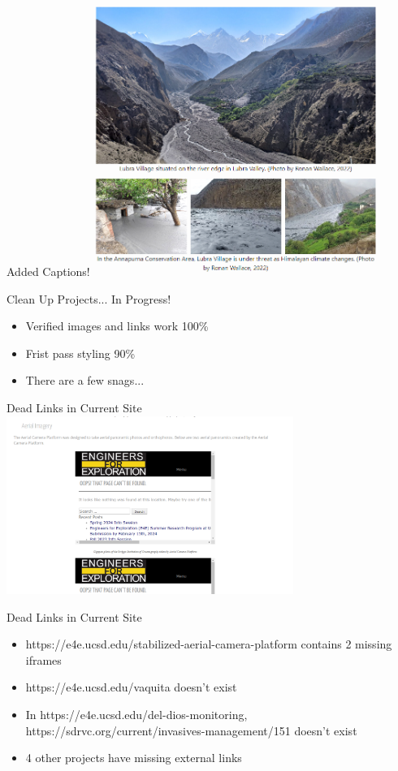 \begin{frame}{Added Captions!}
    \centering
    \includegraphics[height=0.7\textheight,width=0.7\textwidth,keepaspectratio]{images/Screenshot 2024-04-11 205424.png}
\end{frame}

\begin{frame}{Clean Up Projects... In Progress!}
    \begin{itemize}
        \item Verified images and links work 100\%
        \item Frist pass styling 90\%
        \item There are a few snags...
    \end{itemize}
\end{frame}

\begin{frame}{Dead Links in Current Site}
    \centering
    \includegraphics[height=0.7\textheight,width=0.7\textwidth,keepaspectratio]{images/dead_links.png}
\end{frame}

\begin{frame}{Dead Links in Current Site}
    \begin{itemize}
        \item https://e4e.ucsd.edu/stabilized-aerial-camera-platform contains 2 missing iframes
        \item https://e4e.ucsd.edu/vaquita doesn't exist
        \item In https://e4e.ucsd.edu/del-dios-monitoring, https://sdrvc.org/current/invasives-management/151 doesn't exist
        \item 4 other projects have missing external links
    \end{itemize}
\end{frame}


